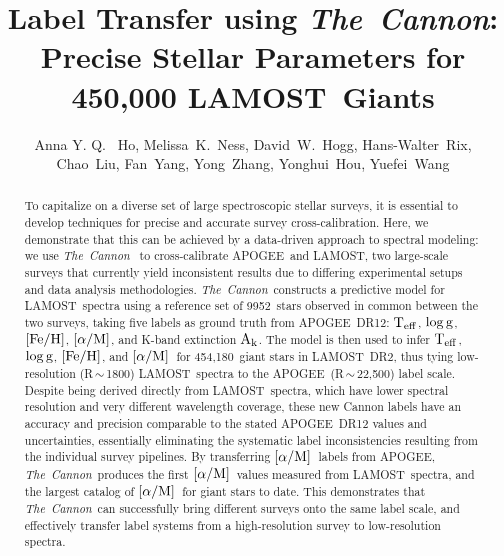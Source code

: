 \documentclass[12pt, letterpaper, preprint]{aastex}
\newcommand{\tc}{\textsl{The~Cannon}}
\newcommand{\apogee}{APOGEE}
\newcommand{\lamost}{LAMOST}
\newcommand{\teff}{\mbox{$\rm T_{eff}$}}
\newcommand{\feh}{\mbox{$\rm [Fe/H]$}}
\newcommand{\alpham}{\mbox{$\rm [\alpha/M]$}}
\newcommand{\logg}{\mbox{$\rm \log g$}}
\newcommand{\ak}{\mbox{$\rm A_k$}}
\newcommand{\ntrobj}{9952}
\newcommand{\nallobj}{454,180}
\begin{document}
\title{Label Transfer using \tc: \\
Precise Stellar Parameters for 450,000 \lamost\ Giants }
\author{Anna Y. Q. ~Ho,
Melissa~K.~Ness,
David~W.~Hogg, 
Hans-Walter~Rix,
Chao~Liu,
Fan~Yang,
Yong~Zhang,
Yonghui~Hou,
Yuefei~Wang
}


\begin{abstract}
To capitalize on a diverse set of large spectroscopic stellar surveys,
it is essential to develop techniques for precise and accurate survey cross-calibration.
Here, we demonstrate that this can be achieved by a data-driven approach to spectral modeling: we use \tc\ \citep{Ness2015} to
cross-calibrate \apogee\ and \lamost, 
two large-scale surveys
that currently yield inconsistent results
due to differing experimental setups and data
analysis methodologies.
\tc\ constructs a predictive model for \lamost\ spectra 
using a reference set of \ntrobj\ stars observed in common between the two surveys, taking five labels as ground truth from \apogee\ DR12:
\teff, \logg, \feh, \alpham, and K-band extinction \ak.
The model is then used to infer 
\teff, \logg, \feh, and \alpham\
for \nallobj\ giant stars in \lamost\ DR2,
thus tying low-resolution (R\,$\sim$\,1800) \lamost\ spectra to the
\apogee\ (R\,$\sim$\,22,500) label scale.
Despite being derived directly from \lamost\ spectra,
which have lower spectral resolution and very different
wavelength coverage,
these new Cannon labels have an accuracy and precision comparable to the stated \apogee\ DR12 values and uncertainties,
essentially eliminating the systematic label inconsistencies resulting from the individual survey pipelines.
By transferring \alpham\ labels from \apogee ,  \tc\ produces the first \alpham\ values measured from \lamost\ spectra, and the largest catalog of \alpham\ for giant stars to date.
This demonstrates that \tc\ can
successfully bring different surveys onto the same label scale,
and effectively transfer label systems from a high-resolution
survey to low-resolution spectra.

\end{abstract}
\end{document}
